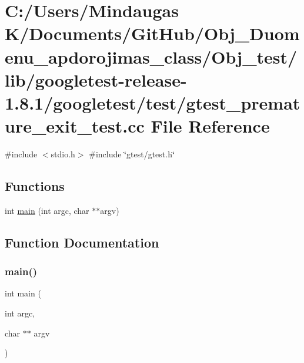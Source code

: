 \hypertarget{_obj__test_2lib_2googletest-release-1_88_81_2googletest_2test_2gtest__premature__exit__test_8cc}{}\section{C\+:/\+Users/\+Mindaugas K/\+Documents/\+Git\+Hub/\+Obj\+\_\+\+Duomenu\+\_\+apdorojimas\+\_\+class/\+Obj\+\_\+test/lib/googletest-\/release-\/1.8.1/googletest/test/gtest\+\_\+premature\+\_\+exit\+\_\+test.cc File Reference}
\label{_obj__test_2lib_2googletest-release-1_88_81_2googletest_2test_2gtest__premature__exit__test_8cc}
{\ttfamily \#include $<$stdio.\+h$>$}\newline
{\ttfamily \#include \char`\"{}gtest/gtest.\+h\char`\"{}}\newline
\subsection*{Functions}
\begin{DoxyCompactItemize}
\item 
int \mbox{\hyperlink{_obj__test_2lib_2googletest-release-1_88_81_2googletest_2test_2gtest__premature__exit__test_8cc_a3c04138a5bfe5d72780bb7e82a18e627}{main}} (int argc, char $\ast$$\ast$argv)
\end{DoxyCompactItemize}


\subsection{Function Documentation}
\mbox{\label{_obj__test_2lib_2googletest-release-1_88_81_2googletest_2test_2gtest__premature__exit__test_8cc_a3c04138a5bfe5d72780bb7e82a18e627}} 
\subsubsection{\texorpdfstring{main()}{main()}}
{\footnotesize\ttfamily int main (\begin{DoxyParamCaption}\item[{int}]{argc,  }\item[{char $\ast$$\ast$}]{argv }\end{DoxyParamCaption})}

